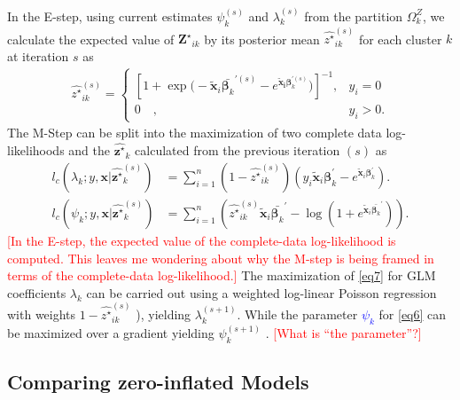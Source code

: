 \documentclass[11pt,letterpaper]{article}
\numberwithin{equation}{section}
\numberwithin{equation}{section}
\numberwithin{equation}{section}
\newcommand{\xTilda}{\tilde{\bm{x}}}
\newcommand{\zZ}{Z^\star}
\newcommand{\zz}{z^\star}
\begin{document}
In the E-step, using current estimates $\psi_k^{(s)}$ and $ \lambda_k^{(s)} $ from the partition $ \Omega^Z_{k}$, we calculate the expected value of ${\bm{\zZ}_{ik}}$ by its posterior mean ${\hat{\zz}_{ik}^{(s)}}$ for each cluster $k$ at iteration $s$ as
\begin{align*}
{\hat{\zz}}_{ik}^{(s)} = \begin{cases}  \left[ 1 + \exp{\big(-\xTilda_i \bar{\bm{\beta}_k}^{'(s)} - e^ {\bm{\xTilda_i} \bm{\beta}_k^{'(s)}} \big) } \right]^{-1}, &  y_{i} = 0 \\
  0 \quad , & y_{i}> 0 .
\end{cases}
\end{align*}
%
The M-Step can be split into the maximization of two complete data log-likelihoods and the $\hat{\bm{\zz}}_k$ calculated from the previous iteration $(s)$ as
\begin{align}
 l_c(\lambda_k; y,\bm{x}| \hat{\bm{\zz}}_k^{(s)}) &= \sum_{i=1}^n (1- \hat{\zz}_{ik}^{(s)}) (y_i \xTilda_i \bm{\beta}_k^{'}  - e^{\xTilda_i \bm{\beta}_k^{'}})\label{eq7}.\\
l_c(\psi_k;y,\bm{x}|\hat{\bm{\zz}}_k^{(s)}) &=\sum_{i=1}^n \left( \hat{\zz}_{ik}^{(s)} \xTilda_i \bar{\bm{\beta}_k }^{'} - \log \left(1+ e^{ \xTilda_i \bar{\bm{\beta}_k }^{'}} \right) \right). \label{eq6}   
 \end{align}
\textcolor{red}{[In the E-step, the expected value of the complete-data log-likelihood is computed. This leaves me wondering about why the M-step is being framed in terms of the complete-data log-likelihood.]}
The maximization of \eqref{eq7} for GLM coefficients $\lambda_k$ can be carried out using a weighted log-linear Poisson regression with weights $1 - \hat{\zz}_{ik}^{(s)}$ \citep[see][]{McCullaghNelder1989}), yielding $\lambda_k^{(s+1)}$.
While the parameter \textcolor{blue}{ $\psi_k$ }for \eqref{eq6} can be maximized over a gradient yielding $\psi_k^{(s+1)}$ \citep[see][]{Lambert}. \textcolor{red}{[What is ``the parameter''?]}

\subsection{Comparing zero-inflated Models}\label{subsec:: compareZero}
\end{document}
